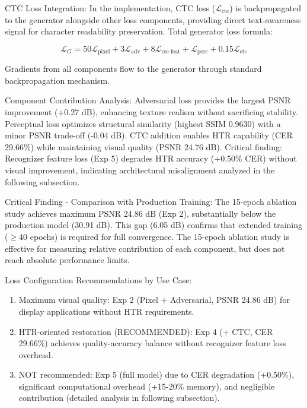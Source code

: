 \documentclass[journal]{IEEEtran}
\begin{document}
CTC Loss Integration:
In the implementation, CTC loss ($\mathcal{L}_{\text{ctc}}$) is backpropagated to the generator alongside other loss components, providing direct text-awareness signal for character readability preservation. Total generator loss formula:

\begin{equation}
\mathcal{L}_G = 50\mathcal{L}_{\text{pixel}} + 3\mathcal{L}_{\text{adv}} + 8\mathcal{L}_{\text{rec-feat}} + \mathcal{L}_{\text{perc}} + 0.15\mathcal{L}_{\text{ctc}}
\end{equation}

Gradients from all components flow to the generator through standard backpropagation mechanism.

Component Contribution Analysis: Adversarial loss provides the largest PSNR improvement (+0.27 dB), enhancing texture realism without sacrificing stability. Perceptual loss optimizes structural similarity (highest SSIM 0.9630) with a minor PSNR trade-off (-0.04 dB). CTC addition enables HTR capability (CER 29.66\%) while maintaining visual quality (PSNR 24.76 dB). Critical finding: Recognizer feature loss (Exp 5) degrades HTR accuracy (+0.50\% CER) without visual improvement, indicating architectural misalignment analyzed in the following subsection.

Critical Finding - Comparison with Production Training: The 15-epoch ablation study achieves maximum PSNR 24.86 dB (Exp 2), substantially below the production model (30.91 dB). This gap (6.05 dB) confirms that extended training ($\geq$40 epochs) is required for full convergence. The 15-epoch ablation study is effective for measuring relative contribution of each component, but does not reach absolute performance limits.

Loss Configuration Recommendations by Use Case:
\begin{enumerate}
    \item Maximum visual quality: Exp 2 (Pixel + Adversarial, PSNR 24.86 dB) for display applications without HTR requirements.
    
    \item HTR-oriented restoration (RECOMMENDED): Exp 4 (+ CTC, CER 29.66\%) achieves quality-accuracy balance without recognizer feature loss overhead.
    
    \item NOT recommended: Exp 5 (full model) due to CER degradation (+0.50\%), significant computational overhead (+15-20\% memory), and negligible contribution (detailed analysis in following subsection).
\end{enumerate}
\end{document}
